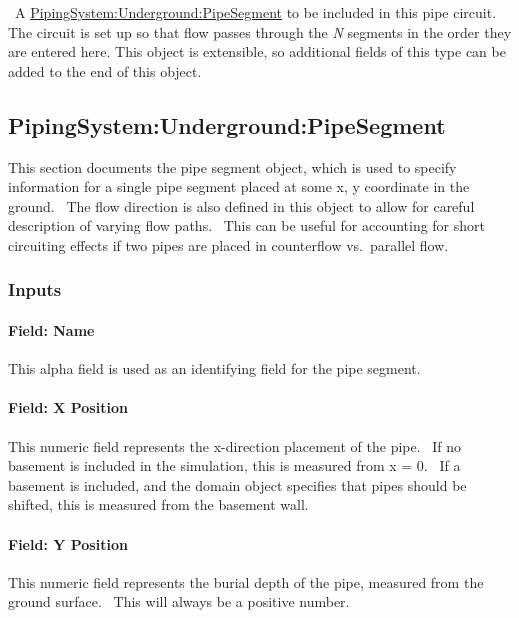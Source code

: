 ~A \hyperref[pipingsystemundergroundpipesegment]{PipingSystem:Underground:PipeSegment} to be included in this pipe circuit.~ The circuit is set up so that flow passes through the \emph{N} segments in the order they are entered here. This object is extensible, so additional fields of this type can be added to the end of this object.

\subsection{PipingSystem:Underground:PipeSegment}\label{pipingsystemundergroundpipesegment}

This section documents the pipe segment object, which is used to specify information for a single pipe segment placed at some x, y coordinate in the ground.~ The flow direction is also defined in this object to allow for careful description of varying flow paths.~ This can be useful for accounting for short circuiting effects if two pipes are placed in counterflow vs.~parallel flow.

\subsubsection{Inputs}\label{inputs-11-009}

\paragraph{Field: Name}\label{field-name-11-008}

This alpha field is used as an identifying field for the pipe segment.

\paragraph{Field: X Position}\label{field-x-position}

This numeric field represents the x-direction placement of the pipe.~ If no basement is included in the simulation, this is measured from x = 0.~ If a basement is included, and the domain object specifies that pipes should be shifted, this is measured from the basement wall.

\paragraph{Field: Y Position}\label{field-y-position}

This numeric field represents the burial depth of the pipe, measured from the ground surface.~ This will always be a positive number.

